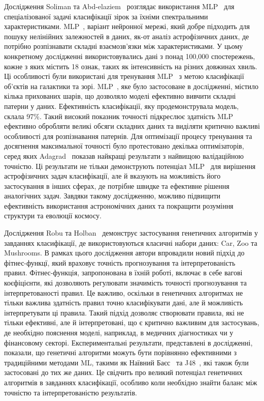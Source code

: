 Дослідження Soliman та Abd-elaziem~\cite{ct14} розглядає використання MLP~\cite{ct26} для спеціалізованої задачі класифікації зірок за їхніми спектральними характеристиками. MLP~\cite{ct26}, варіант нейронної мережі, який добре підходить для пошуку нелінійних залежностей в даних, як-от аналіз астрофізичних даних, де потрібно розпізнавати складні взаємозв'язки між характеристиками. У цьому конкретному дослідженні використовувались дані з понад 100,000 спостережень, кожне з яких містить 18 ознак, таких як інтенсивність на різних довжинах хвиль. Ці особливості були використані для тренування MLP~\cite{ct26} з метою класифікації об'єктів на галактики та зорі. MLP~\cite{ct26}, яке було застосоване в дослідженні, містило кілька прихованих шарів, що дозволяло моделі ефективно вивчити складні патерни у даних. Ефективність класифікації, яку продемонструвала модель, склала 97$\%$. Такий високий показник точності підкреслює здатність MLP~\cite{ct26} ефективно обробляти великі обсяги складних даних та виділяти критично важливі особливості для розпізнавання патернів. Для оптимізації процесу тренування та досягнення максимальної точності було протестовано декілька оптимізаторів, серед яких Adagrad~\cite{ct29} показав найкращі результати з найвищою валідаційною точністю. Ці результати не тільки демонструють потенціал MLP~\cite{ct26} для вирішення астрофізичних задач класифікації, але й вказують на можливість його застосування в інших сферах, де потрібне швидке та ефективне рішення аналогічних задач. Завдяки такому дослідженню, можливо підвищити ефективність використання астрономічних даних та покращити розуміння структури та еволюції космосу.

Дослідження Robu та Holban~\cite{ct15} демонструє застосування генетичних алгоритмів у завданнях класифікації, де використовуються класичні набори даних: Car, Zoo та Mushrooms. В рамках цього дослідження автори впровадили новий підхід до фітнес-функцї, який враховує точність прогнозування та інтерпретованість правил. Фітнес-функція, запропонована в їхній роботі, включає в себе вагові коєфіцієнти, які дозволяють регулювати значимість точності прогнозування та інтерпретованості правил. Це важливо, оскільки в генетичних алгоритмах не тільки важлива здатність правил точно класифікувати дані, але й можливість інтерпретувати ці правила. Такий підхід дозволяє створювати правила, які не тільки ефективні, але й інтерпретовані, що є критично важливим для застосувань, де необхідно пояснення моделі, наприклад, в медичних діагностиках чи у фінансовому секторі. Експериментальні результати, представлені в дослідженні, показали, що генетичні алгоритми можуть бути порівнянно ефективними з традиційними методами ML, такими як Наївний Баєс~\cite{ct16} та J48~\cite{ct17}, які також були застосовані до тих же даних. Це свідчить про великий потенціал генетичних алгоритмів в завданнях класифікації, особливо коли необхідно знайти баланс між точністю та інтерпретованістю результатів.


